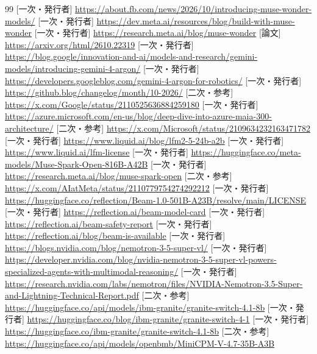 \documentclass[lualatex,a4paper,10pt]{jlreq}
\begin{document}
\footnotesize\setlength{\itemsep}{2pt}\setlength{\parsep}{0pt}
\begin{thebibliography}{99}
 [一次・発行者] \url{https://about.fb.com/news/2026/10/introducing-muse-wonder-models/}
 [一次・発行者] \url{https://dev.meta.ai/resources/blog/build-with-muse-wonder}
 [一次・発行者] \url{https://research.meta.ai/blog/muse-wonder}
 [論文] \url{https://arxiv.org/html/2610.22319}
 [一次・発行者] \url{https://blog.google/innovation-and-ai/models-and-research/gemini-models/introducing-gemini-4-argon/}
 [一次・発行者] \url{https://developers.googleblog.com/gemini-4-argon-for-robotics/}
 [一次・発行者] \url{https://github.blog/changelog/month/10-2026/}
 [二次・参考] \url{https://x.com/Google/status/2110525636884259180}
 [一次・発行者] \url{https://azure.microsoft.com/en-us/blog/deep-dive-into-azure-maia-300-architecture/}
 [二次・参考] \url{https://x.com/Microsoft/status/2109634232163471782}
 [一次・発行者] \url{https://www.liquid.ai/blog/lfm2-5-24b-a2b}
 [一次・発行者] \url{https://www.liquid.ai/lfm-license}
 [一次・発行者] \url{https://huggingface.co/meta-models/Muse-Spark-Open-816B-A42B}
 [一次・発行者] \url{https://research.meta.ai/blog/muse-spark-open}
 [二次・参考] \url{https://x.com/AIatMeta/status/2110779754274292212}
 [一次・発行者] \url{https://huggingface.co/reflection/Beam-1.0-501B-A23B/resolve/main/LICENSE}
 [一次・発行者] \url{https://reflection.ai/beam-model-card}
 [一次・発行者] \url{https://reflection.ai/beam-safety-report}
 [一次・発行者] \url{https://reflection.ai/blog/beam-is-available}
 [一次・発行者] \url{https://blogs.nvidia.com/blog/nemotron-3-5-super-vl/}
 [一次・発行者] \url{https://developer.nvidia.com/blog/nvidia-nemotron-3-5-super-vl-powers-specialized-agents-with-multimodal-reasoning/}
 [一次・発行者] \url{https://research.nvidia.com/labs/nemotron/files/NVIDIA-Nemotron-3.5-Super-and-Lightning-Technical-Report.pdf}
 [二次・参考] \url{https://huggingface.co/api/models/ibm-granite/granite-switch-4.1-8b}
 [一次・発行者] \url{https://huggingface.co/blog/ibm-granite/granite-switch-4-1}
 [一次・発行者] \url{https://huggingface.co/ibm-granite/granite-switch-4.1-8b}
 [二次・参考] \url{https://huggingface.co/api/models/openbmb/MiniCPM-V-4.7-35B-A3B}

\end{thebibliography}
\end{document}
